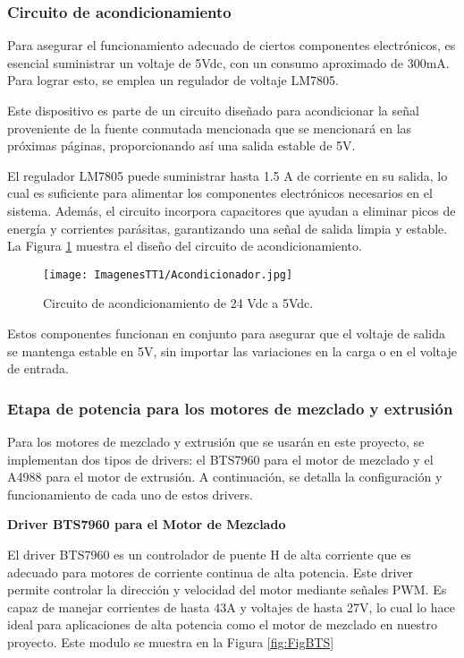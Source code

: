 \documentclass[14pt,oneside]{extarticle} %
\begin{document}
\subsubsection{Circuito de acondicionamiento}

Para asegurar el funcionamiento adecuado de ciertos componentes electrónicos, es esencial suministrar un voltaje de 5Vdc, con un consumo aproximado de 300mA. Para lograr esto, se emplea un regulador de voltaje LM7805. 

Este dispositivo es parte de un circuito diseñado para acondicionar la señal proveniente de la fuente conmutada mencionada que se mencionará en las próximas páginas, proporcionando así una salida estable de 5V.

El regulador LM7805 puede suministrar hasta 1.5 A de corriente en su salida, lo cual es suficiente para alimentar los componentes electrónicos necesarios en el sistema. Además, el circuito incorpora capacitores que ayudan a eliminar picos de energía y corrientes parásitas, garantizando una señal de salida limpia y estable. La Figura \ref{fig:acondicionamiento} muestra el diseño del circuito de acondicionamiento.

\begin{figure}[h!]
    \centering
    \texttt{[image: ImagenesTT1/Acondicionador.jpg]}
    \caption{Circuito de acondicionamiento de 24 Vdc a 5Vdc.}
    \label{fig:acondicionamiento}
\end{figure}

Estos componentes funcionan en conjunto para asegurar que el voltaje de salida se mantenga estable en 5V, sin importar las variaciones en la carga o en el voltaje de entrada.

\newpage

\subsubsection{Etapa de potencia para los motores de mezclado y extrusión}

Para los motores de mezclado y extrusión que se usarán en este proyecto, se implementan dos tipos de drivers: el BTS7960 para el motor de mezclado y el A4988 para el motor de extrusión. A continuación, se detalla la configuración y funcionamiento de cada uno de estos drivers.

\textbf{Driver BTS7960 para el Motor de Mezclado}

El driver BTS7960 es un controlador de puente H de alta corriente que es adecuado para motores de corriente continua de alta potencia. Este driver permite controlar la dirección y velocidad del motor mediante señales PWM. Es capaz de manejar corrientes de hasta 43A y voltajes de hasta 27V, lo cual lo hace ideal para aplicaciones de alta potencia como el motor de mezclado en nuestro proyecto. Este modulo se muestra en la Figura \ref{fig:FigBTS}
\end{document}

